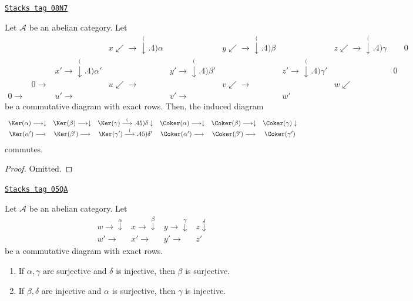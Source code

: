 \begin{lemma}
\label{homology-lemma-snake-natural}
\href{https://stacks.math.columbia.edu/tag/08N7}{\texttt{Stacks tag 08N7}}

Let $\mathcal{A}$ be an abelian category. Let
$$
\begin{array}{cccccccccc} &  &  & x\swarrow\longrightarrow\overset{(}{\downarrow}.4)\alpha &  & y\swarrow\longrightarrow\overset{(}{\downarrow}.4)\beta &  & z\swarrow\longrightarrow\overset{(}{\downarrow}.4)\gamma &  & 0 \\  &  & x'\longrightarrow\overset{(}{\downarrow}.4){\alpha'} &  & y'\longrightarrow\overset{(}{\downarrow}.4){\beta'} &  & z'\longrightarrow\overset{(}{\downarrow}.4){\gamma'} &  & 0 &  \\  & 0\longrightarrow &  & u\swarrow\longrightarrow &  & v\swarrow\longrightarrow &  & w\swarrow &  &  \\ 0\longrightarrow &  & u'\longrightarrow &  & v'\longrightarrow &  & w' &  &  & \end{array}
$$
be a commutative diagram with exact rows. Then, the induced diagram
$$
\begin{array}{cccccc}\Ker(\alpha) \longrightarrow\downarrow & \Ker(\beta) \longrightarrow\downarrow & \Ker(\gamma) \overset{(}{\longrightarrow}.45){\delta} \downarrow & \Coker(\alpha) \longrightarrow\downarrow & \Coker(\beta) \longrightarrow\downarrow & \Coker(\gamma) \downarrow \\ \Ker(\alpha') \longrightarrow & \Ker(\beta') \longrightarrow & \Ker(\gamma') \overset{(}{\longrightarrow}.45){\delta'} & \Coker(\alpha') \longrightarrow & \Coker(\beta') \longrightarrow & \Coker(\gamma')\end{array}
$$
commutes.
\end{lemma}

\begin{proof}
Omitted.
\end{proof}

\begin{lemma}
\label{homology-lemma-four-lemma}
\href{https://stacks.math.columbia.edu/tag/05QA}{\texttt{Stacks tag 05QA}}

Let $\mathcal{A}$ be an abelian category. Let
$$
\begin{array}{cccc}w \longrightarrow\overset{\alpha}{\downarrow} & x \longrightarrow\overset{\beta}{\downarrow} & y \longrightarrow\overset{\gamma}{\downarrow} & z \overset{\delta}{\downarrow} \\ w' \longrightarrow & x' \longrightarrow & y' \longrightarrow & z'\end{array}
$$
be a commutative diagram with exact rows.
\begin{enumerate}
\item If $\alpha, \gamma$ are surjective and $\delta$ is injective, then
$\beta$ is surjective.
\item If $\beta, \delta$ are injective and $\alpha$ is surjective, then
$\gamma$ is injective.
\end{enumerate}
\end{lemma}

